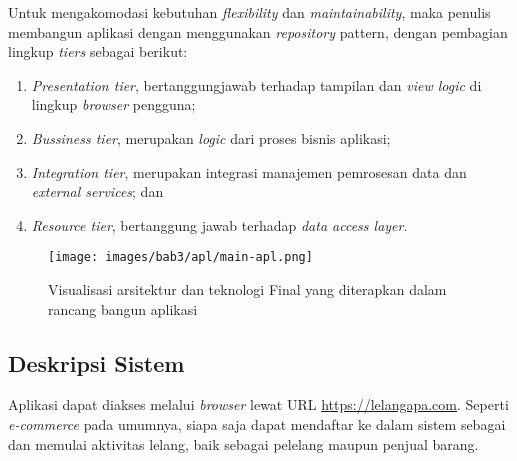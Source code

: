 		
		Untuk mengakomodasi kebutuhan \textit{flexibility} dan \textit{maintainability}, maka penulis membangun aplikasi dengan menggunakan \textit{repository} pattern, dengan pembagian lingkup \textit{tiers} sebagai berikut:
		\begin{enumerate}
			\item \textit{Presentation tier}, bertanggungjawab terhadap tampilan dan \textit{view logic} di lingkup \textit{browser} pengguna;
			\item \textit{Bussiness tier}, merupakan \textit{logic} dari proses bisnis aplikasi;
			\item \textit{Integration tier}, merupakan integrasi manajemen pemrosesan data dan \textit{external services}; dan
			\item \textit{Resource tier}, bertanggung jawab terhadap \textit{data access layer}.
		\end{enumerate}
		\begin{figure}[t]
			\centering
			\texttt{[image: images/bab3/apl/main-apl.png]}
			\caption{Visualisasi arsitektur dan teknologi Final yang diterapkan dalam rancang bangun aplikasi}
			\label{tiers}
		\end{figure}
\subsection{Deskripsi Sistem}
Aplikasi dapat diakses melalui \textit{browser} lewat URL {\url{https://lelangapa.com}}. Seperti \textit{e-commerce} pada umumnya, siapa saja dapat mendaftar ke dalam sistem sebagai dan memulai aktivitas lelang, baik sebagai pelelang maupun penjual barang.
